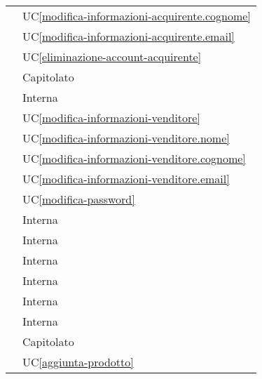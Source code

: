 \begin{longtable}{C{6cm} C{6cm}}
     & UC\ref{modifica-informazioni-acquirente.cognome} \\

     & UC\ref{modifica-informazioni-acquirente.email} \\

     & UC\ref{eliminazione-account-acquirente} \\

     & Capitolato \\

     & Interna \\

     & UC\ref{modifica-informazioni-venditore} \\
        
     & UC\ref{modifica-informazioni-venditore.nome} \\
        
     & UC\ref{modifica-informazioni-venditore.cognome} \\
        
     & UC\ref{modifica-informazioni-venditore.email} \\

     & UC\ref{modifica-password} \\

     & Interna \\

     & Interna \\ 

     & Interna \\

     & Interna \\

     & Interna \\

     & Interna \\

     & Capitolato \\

     & UC\ref{aggiunta-prodotto} \\
        

\end{longtable}
